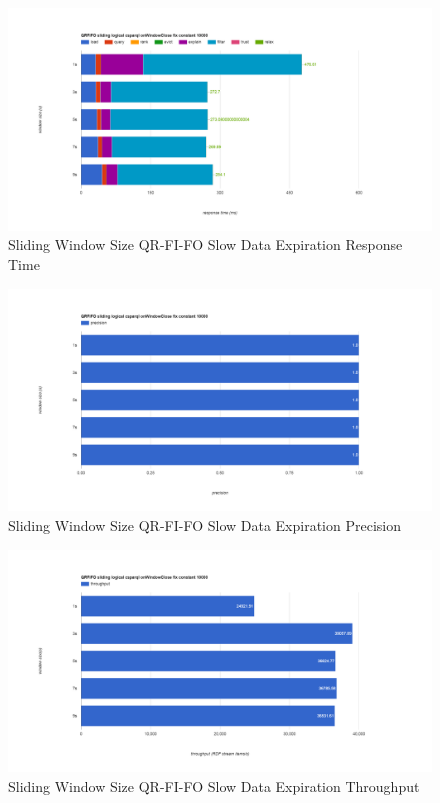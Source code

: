 \begin{figure}[!htbp]
    \centering
    \includegraphics[width=\textwidth]{img/app3-slide-ws-qrfifo-slow-r.png}
    \caption{Sliding Window Size QR-FI-FO Slow Data Expiration Response Time}
\end{figure}
\begin{figure}[!htbp]
    \centering
    \includegraphics[width=\textwidth]{img/app3-slide-ws-qrfifo-slow-p.png}
    \caption{Sliding Window Size QR-FI-FO Slow Data Expiration Precision}
\end{figure}
\begin{figure}[!htbp]
    \centering
    \includegraphics[width=\textwidth]{img/app3-slide-ws-qrfifo-slow-t.png}
    \caption{Sliding Window Size QR-FI-FO Slow Data Expiration Throughput}
\end{figure}
